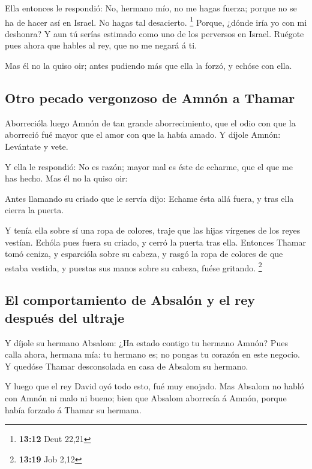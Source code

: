  Ella entonces le respondió: No, hermano mío, no me hagas
fuerza; porque no se ha de hacer así en Israel. No hagas tal desacierto.
\footnote{\textbf{13:12} Deut 22,21}  Porque, ¿dónde iría
yo con mi deshonra? Y aun tú serías estimado como uno de los perversos
en Israel. Ruégote pues ahora que hables al rey, que no me negará á ti.

 Mas él no la quiso oir; antes pudiendo más que ella la
forzó, y echóse con ella.

\hypertarget{otro-pecado-vergonzoso-de-amnuxf3n-a-thamar}{%
\subsection{Otro pecado vergonzoso de Amnón a
Thamar}\label{otro-pecado-vergonzoso-de-amnuxf3n-a-thamar}}

 Aborrecióla luego Amnón de tan grande aborrecimiento,
que el odio con que la aborreció fué mayor que el amor con que la había
amado. Y díjole Amnón: Levántate y vete.

 Y ella le respondió: No es razón; mayor mal es éste de
echarme, que el que me has hecho. Mas él no la quiso oir:

 Antes llamando su criado que le servía dijo: Echame ésta
allá fuera, y tras ella cierra la puerta.

 Y tenía ella sobre sí una ropa de colores, traje que las
hijas vírgenes de los reyes vestían. Echóla pues fuera su criado, y
cerró la puerta tras ella.  Entonces Thamar tomó ceniza,
y esparcióla sobre su cabeza, y rasgó la ropa de colores de que estaba
vestida, y puestas sus manos sobre su cabeza, fuése gritando.
\footnote{\textbf{13:19} Job 2,12}

\hypertarget{el-comportamiento-de-absaluxf3n-y-el-rey-despuuxe9s-del-ultraje}{%
\subsection{El comportamiento de Absalón y el rey después del
ultraje}\label{el-comportamiento-de-absaluxf3n-y-el-rey-despuuxe9s-del-ultraje}}

 Y díjole su hermano Absalom: ¿Ha estado contigo tu
hermano Amnón? Pues calla ahora, hermana mía: tu hermano es; no pongas
tu corazón en este negocio. Y quedóse Thamar desconsolada en casa de
Absalom su hermano.

 Y luego que el rey David oyó todo esto, fué muy enojado.
 Mas Absalom no habló con Amnón ni malo ni bueno; bien
que Absalom aborrecía á Amnón, porque había forzado á Thamar su hermana.

